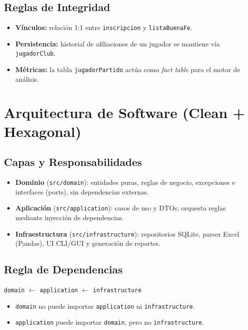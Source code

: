 \documentclass[11pt,a4paper]{article}
\newcommand{\fpath}[1]{\texttt{\small #1}}
\begin{document}
\subsection{Reglas de Integridad}
\begin{itemize}[nosep]
  \item \textbf{Vínculos:} relación 1:1 entre \fpath{inscripcion} y \fpath{listaBuenaFe}.
  \item \textbf{Persistencia:} historial de afiliaciones de un jugador se mantiene vía \fpath{jugadorClub}.
  \item \textbf{Métricas:} la tabla \fpath{jugadorPartido} actúa como \textit{fact table} para el motor de análisis.
\end{itemize}

\section{Arquitectura de Software (Clean + Hexagonal)}

\subsection{Capas y Responsabilidades}
\begin{itemize}[nosep]
  \item \textbf{Dominio} (\fpath{src/domain}): entidades puras, reglas de negocio, excepciones e interfaces (ports), sin dependencias externas.
  \item \textbf{Aplicación} (\fpath{src/application}): casos de uso y DTOs; orquesta reglas mediante inyección de dependencias.
  \item \textbf{Infraestructura} (\fpath{src/infrastructure}): repositorios SQLite, parser Excel (Pandas), UI CLI/GUI y generación de reportes.
\end{itemize}

\subsection{Regla de Dependencias}
\begin{center}
\fpath{domain} $\leftarrow$ \fpath{application} $\leftarrow$ \fpath{infrastructure}
\end{center}
\begin{itemize}[nosep]
  \item \fpath{domain} no puede importar \fpath{application} ni \fpath{infrastructure}.
  \item \fpath{application} puede importar \fpath{domain}, pero no \fpath{infrastructure}.
\end{itemize}
\end{document}
